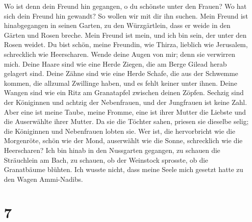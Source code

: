  Wo ist denn dein Freund hin gegangen, o du schönste unter
den Frauen? Wo hat sich dein Freund hin gewandt? So wollen wir mit dir
ihn suchen.  Mein Freund ist hinabgegangen in seinen
Garten, zu den Würzgärtlein, dass er weide in den Gärten und Rosen
breche.  Mein Freund ist mein, und ich bin sein, der unter
den Rosen weidet.  Du bist schön, meine Freundin, wie
Thirza, lieblich wie Jerusalem, schrecklich wie Heerscharen.
 Wende deine Augen von mir; denn sie verwirren mich. Deine
Haare sind wie eine Herde Ziegen, die am Berge Gilead herab gelagert
sind.  Deine Zähne sind wie eine Herde Schafe, die aus der
Schwemme kommen, die allzumal Zwillinge haben, und es fehlt keiner unter
ihnen.  Deine Wangen sind wie ein Ritz am Granatapfel
zwischen deinen Zöpfen.  Sechzig sind der Königinnen und
achtzig der Nebenfrauen, und der Jungfrauen ist keine Zahl.
 Aber eine ist meine Taube, meine Fromme, eine ist ihrer
Mutter die Liebste und die Auserwählte ihrer Mutter. Da sie die Töchter
sahen, priesen sie dieselbe selig; die Königinnen und Nebenfrauen lobten
sie.  Wer ist, die hervorbricht wie die Morgenröte, schön
wie der Mond, auserwählt wie die Sonne, schrecklich wie die Heerscharen?
 Ich bin hinab in den Nussgarten gegangen, zu schauen die
Sträuchlein am Bach, zu schauen, ob der Weinstock sprosste, ob die
Granatbäume blühten.  Ich wusste nicht, dass meine Seele
mich gesetzt hatte zu den Wagen Ammi-Nadibs.

\hypertarget{section-6}{%
\section{7}\label{section-6}}


